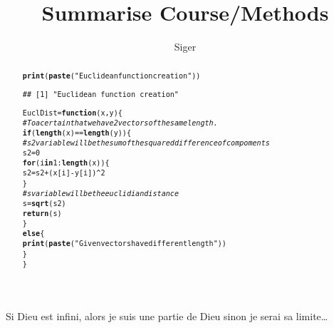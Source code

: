 \documentclass[a4paper, 10pt]{scrartcl}\usepackage[]{graphicx}\usepackage[]{color}
\title{Summarise Course/Methods}
\author{Siger}
\makeatletter
\newcommand{\hlnum}[1]{\textcolor[rgb]{0.686,0.059,0.569}{#1}}%
\newcommand{\hlstr}[1]{\textcolor[rgb]{0.192,0.494,0.8}{#1}}%
\newcommand{\hlcom}[1]{\textcolor[rgb]{0.678,0.584,0.686}{\textit{#1}}}%
\newcommand{\hlopt}[1]{\textcolor[rgb]{0,0,0}{#1}}%
\newcommand{\hlstd}[1]{\textcolor[rgb]{0.345,0.345,0.345}{#1}}%
\newcommand{\hlkwa}[1]{\textcolor[rgb]{0.161,0.373,0.58}{\textbf{#1}}}%
\newcommand{\hlkwb}[1]{\textcolor[rgb]{0.69,0.353,0.396}{#1}}%
\newcommand{\hlkwc}[1]{\textcolor[rgb]{0.333,0.667,0.333}{#1}}%
\newcommand{\hlkwd}[1]{\textcolor[rgb]{0.737,0.353,0.396}{\textbf{#1}}}%
\newenvironment{kframe}{%
 \def\at@end@of@kframe{}%
 \ifinner\ifhmode%
  \def\at@end@of@kframe{\end{minipage}}%
  \begin{minipage}{\columnwidth}%
 \fi\fi%
 \def\FrameCommand##1{\hskip\@totalleftmargin \hskip-\fboxsep
 \colorbox{shadecolor}{##1}\hskip-\fboxsep
     \hskip-\linewidth \hskip-\@totalleftmargin \hskip\columnwidth}%
 \MakeFramed {\advance\hsize-\width
   \@totalleftmargin\z@ \linewidth\hsize
   \@setminipage}}%
 {\par\unskip\endMakeFramed%
 \at@end@of@kframe}
\newenvironment{knitrout}{}{} %
\makeatother
\begin{document}
\maketitle

Si Dieu est infini, alors je suis une partie de Dieu sinon je serai sa limite\ldots

\tableofcontents

\begin{abstract}
\begin{knitrout}
\color{fgcolor}\begin{kframe}
\begin{alltt}
\hlkwd{print}\hlstd{(}\hlkwd{paste}\hlstd{(}\hlstr{"Euclidean function creation"}\hlstd{))}
\end{alltt}
\begin{verbatim}
## [1] "Euclidean function creation"
\end{verbatim}
\begin{alltt}
\hlstd{EuclDist} \hlkwb{=} \hlkwa{function}\hlstd{(}\hlkwc{x}\hlstd{,} \hlkwc{y}\hlstd{)\{}
        \hlcom{#To acertain that we have 2 vectors of the same length.}
        \hlkwa{if} \hlstd{(}\hlkwd{length}\hlstd{(x)}\hlopt{==}\hlkwd{length}\hlstd{(y))\{}
                \hlcom{#s2 variable will be the sum of the squared difference of compoments}
                \hlstd{s2}\hlkwb{=}\hlnum{0}
                \hlkwa{for} \hlstd{(i} \hlkwa{in} \hlnum{1}\hlopt{:}\hlkwd{length}\hlstd{(x))\{}
                        \hlstd{s2}\hlkwb{=}\hlstd{s2}\hlopt{+}\hlstd{(x[i]}\hlopt{-}\hlstd{y[i])}\hlopt{^}\hlnum{2}
                \hlstd{\}}
                \hlcom{#s variable will be the euclidian distance}
                \hlstd{s}\hlkwb{=}\hlkwd{sqrt}\hlstd{(s2)}
                \hlkwd{return}\hlstd{(s)}
        \hlstd{\}}
        \hlkwa{else}\hlstd{\{}
                \hlkwd{print}\hlstd{(}\hlkwd{paste}\hlstd{(}\hlstr{"Given vectors have different length"}\hlstd{))}
        \hlstd{\}}
\hlstd{\}}


\end{alltt}
\end{kframe}
\end{knitrout}
\end{abstract}
\end{document}

